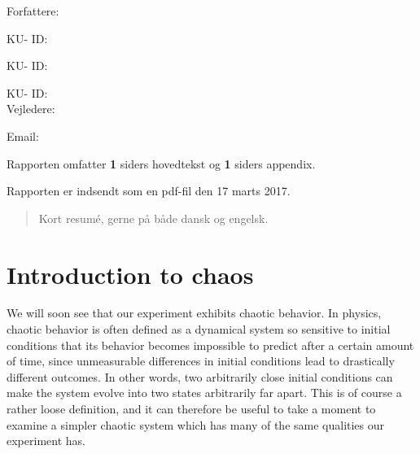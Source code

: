\documentclass[12pt,oneside,a4paper]{article}
\numberwithin{equation}{section}
\begin{document}
\vfill
{\large Forfattere:}\\
{\large \hspace*{1cm}   \hspace{1cm} KU- ID:  \\
{\large \hspace*{1cm}    \hspace{1cm} KU- ID:  \\
{\large \hspace*{1cm}    \hspace{1cm} KU- ID:  \\

{\large Vejledere:}\\
{\large \hspace*{1cm}   \hspace{1cm} Email:  \\

\vfill

{\large Rapporten omfatter {\bf 1} siders hovedtekst og {\bf 1} siders appendix.}

{\large Rapporten er indsendt som en pdf-fil den 17 marts 2017. }

\normalsize


\newpage
\begin{abstract}
Kort resumé, gerne på både dansk og engelsk.
\end{abstract}

\newpage

\tableofcontents


\newpage
{}
\section{Introduction to chaos}
\label{chaos}
We will soon see that our experiment exhibits chaotic behavior. In physics, 
chaotic behavior is often defined as a dynamical system so sensitive to 
initial conditions that its behavior becomes impossible to predict after a 
certain amount of time, since unmeasurable differences in initial conditions 
lead to drastically different outcomes. In other words, two arbitrarily close 
initial conditions can make the system evolve into two states arbitrarily far 
apart. This is of course a rather loose definition, and it can therefore be 
useful to take a moment to examine a simpler chaotic system which has many of 
the same qualities our experiment has.

}}}}
\end{document}
